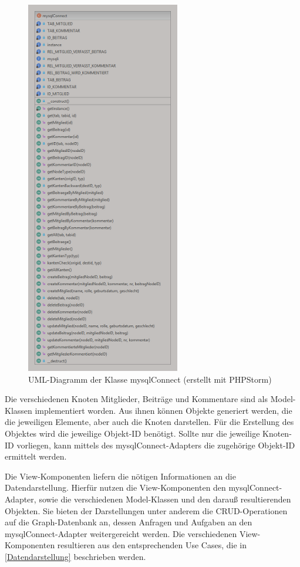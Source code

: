 \begin{figure}	
	\centering
	\includegraphics[width=0.6\textwidth]{images/mysqlConnect2.png}
	\caption{UML-Diagramm der Klasse \grqq mysqlConnect\grqq{} (erstellt mit PHPStorm)}
\end{figure}

Die verschiedenen Knoten Mitglieder, Beiträge und Kommentare sind als Model-Klassen implementiert worden. Aus ihnen können Objekte generiert werden, die die jeweiligen Elemente, aber auch die Knoten darstellen. Für die Erstellung des Objektes wird die jeweilige Objekt-ID benötigt. Sollte nur die jeweilige Knoten-ID vorliegen, kann mittels des mysqlConnect-Adapters die zugehörige Objekt-ID ermittelt werden.

Die View-Komponenten liefern die nötigen Informationen an die Datendarstellung. Hierfür nutzen die View-Komponenten den mysqlConnect-Adapter, sowie die verschiedenen Model-Klassen und den darauß resultierenden Objekten. Sie bieten der Darstellungen unter anderem die CRUD-Operationen auf die Graph-Datenbank an, dessen Anfragen und Aufgaben an den mysqlConnect-Adapter weitergereicht werden. Die verschiedenen View-Komponenten resultieren aus den entsprechenden Use Cases, die in \ref{Datendarstellung}  beschrieben werden.

